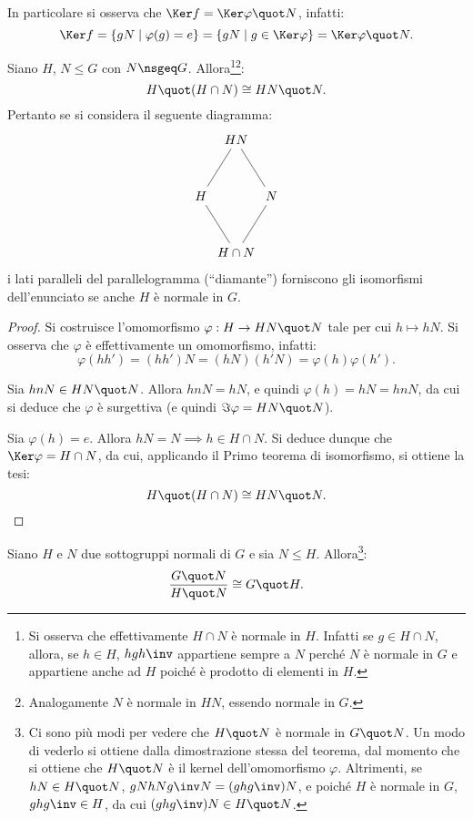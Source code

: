 \documentclass[12pt]{scrartcl}
\begin{document}
	In particolare si osserva che $\Ker f = \Ker \varphi \quot N$,
	infatti:
	\[ \Ker f = \{ gN \mid \varphi(g) = e \} = \{ gN \mid g \in \Ker \varphi \} = \Ker \varphi \quot N.
	 \]
	
	\begin{theorem}
		Siano $H$, $N \leq G$ con $N \nsgeq G$. Allora\footnote{
			Si osserva che effettivamente $H \cap N$ è normale in
			$H$. Infatti se $g \in H \cap N$, allora, se
			$h \in H$, $h g h\inv$ appartiene sempre a $N$
			perché $N$ è normale in $G$ e appartiene anche
			ad $H$ poiché è prodotto di elementi in $H$.	
		}\footnote{
			Analogamente $N$ è normale in $HN$, essendo
			normale in $G$.
		}:
		\[ H \quot (H \cap N) \cong HN \quot N. \]
		Pertanto se si considera il seguente diagramma:
		\[\begin{tikzcd}[column sep=0em,row sep=3em]
			& HN \arrow[dl,dash] \arrow[dr,dash] \\
			H \arrow[dr,dash] && N \arrow[dl,dash] \\
			& H\cap N
		\end{tikzcd}\]
		i lati paralleli del parallelogramma (``diamante'')
		forniscono gli isomorfismi dell'enunciato se anche
		$H$ è normale in $G$.
	\end{theorem}
	
	\begin{proof}
		Si costruisce l'omomorfismo $\varphi : H \to HN \quot N$
		tale per cui $h \mapsto hN$. Si osserva che $\varphi$ è
		effettivamente un omomorfismo, infatti:
		\[ \varphi(hh') = (hh')N = (hN) (h'N) = \varphi(h) \varphi(h'). \]
		
		Sia $hnN \in HN \quot N$. Allora $hnN = hN$, e quindi
		$\varphi(h) = hN = hnN$, da cui si deduce che
		$\varphi$ è surgettiva (e quindi $\Im \varphi = HN \quot N$).
		\medskip

		
		Sia $\varphi(h) = e$. Allora $hN = N \implies h \in H \cap N$.
		Si deduce dunque che $\Ker \varphi = H \cap N$, da cui,
		applicando il Primo teorema di isomorfismo, si ottiene
		la tesi:
		\[ H \quot (H \cap N) \cong HN \quot N. \]
	\end{proof}
	
	\begin{theorem}
		Siano $H$ e $N$ due sottogruppi normali di $G$ e sia
		$N \leq H$. Allora\footnote{
			Ci sono più modi per vedere che $H \quot N$ è
			normale in $G \quot N$. Un modo di vederlo si
			ottiene dalla dimostrazione stessa del teorema,
			dal momento che si ottiene che $H \quot N$ è
			il kernel dell'omomorfismo $\varphi$. Altrimenti,
			se $hN \in H \quot N$, $gN hN g\inv N = (ghg\inv)N$,
			e poiché $H$ è normale in $G$, $ghg\inv \in H$, da
			cui $(ghg\inv)N \in H \quot N$.
		}:
		\[ \frac{G \quot N}{H \quot N} \cong G \quot H. \]
	\end{theorem}
	
\end{document}
